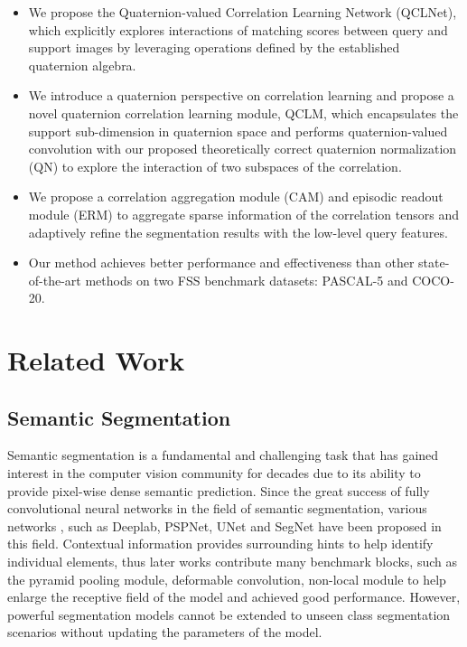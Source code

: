 \documentclass[lettersize,journal]{IEEEtran}
\begin{document}
\begin{itemize}
\item We propose the Quaternion-valued Correlation Learning Network (QCLNet), which explicitly explores interactions of matching scores between query and support images by leveraging operations defined by the established quaternion algebra.

\item We introduce a quaternion perspective on correlation learning and propose a novel quaternion correlation learning module, QCLM, which encapsulates the support sub-dimension in quaternion space and performs quaternion-valued convolution with our proposed theoretically correct quaternion normalization (QN) to explore the interaction of two subspaces of the correlation.

\item We propose a correlation aggregation module (CAM) and episodic readout module (ERM) to aggregate sparse information of the correlation tensors and adaptively refine the segmentation results with the low-level query features.

\item Our method achieves better performance and effectiveness than other state-of-the-art methods on two FSS benchmark datasets: PASCAL-5 and COCO-20.

\end{itemize}

\section{Related Work}
\subsection{Semantic Segmentation}
Semantic segmentation is a fundamental and challenging task that has gained interest in the computer vision community for decades due to its ability to provide pixel-wise dense semantic prediction\cite{RN43, RN44, RN2, RN46}. Since the great success of fully convolutional neural networks in the field of semantic segmentation, various networks , such as Deeplab\cite{RN48}, PSPNet\cite{RN3}, UNet\cite{RN2} and SegNet\cite{RN43} have been proposed in this field. Contextual information provides surrounding hints to help identify individual elements, thus later works contribute many benchmark blocks, such as the pyramid pooling module\cite{RN3}, deformable convolution\cite{RN53}, non-local module\cite{RN59} to help enlarge the receptive field of the model and achieved good performance. However, powerful segmentation models cannot be extended to unseen class segmentation scenarios without updating the parameters of the model.
\end{document}

